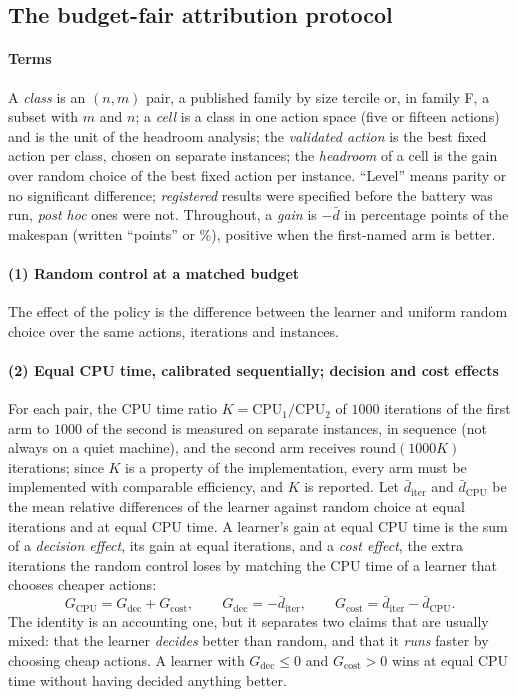 \subsection{The budget-fair attribution protocol}
\label{sec:protocol}
\paragraph{Terms} A \emph{class} is an $(n,m)$ pair, a published family by size tercile or, in family F, a subset with $m$ and $n$; a \emph{cell} is a class in one action space (five or fifteen actions) and is the unit of the headroom analysis; the \emph{validated action} is the best fixed action per class, chosen on separate instances; the \emph{headroom} of a cell is the gain over random choice of the best fixed action per instance. ``Level'' means parity or no significant difference; \emph{registered} results were specified before the battery was run, \emph{post hoc} ones were not. Throughout, a \emph{gain} is $-\bar d$ in percentage points of the makespan (written ``points'' or $\%$), positive when the first-named arm is better.

\paragraph{(1) Random control at a matched budget} The effect of the policy is the difference between the learner and uniform random choice over the same actions, iterations and instances.

\paragraph{(2) Equal CPU time, calibrated sequentially; decision and cost effects} For each pair, the CPU time ratio $K=\mathrm{CPU}_1/\mathrm{CPU}_2$ of $1000$ iterations of the first arm to $1000$ of the second is measured on separate instances, in sequence (not always on a quiet machine), and the second arm receives $\mathrm{round}(1000K)$ iterations; since $K$ is a property of the implementation, every arm must be implemented with comparable efficiency, and $K$ is reported. Let $\bar d_{\mathrm{iter}}$ and $\bar d_{\mathrm{CPU}}$ be the mean relative differences of the learner against random choice at equal iterations and at equal CPU time. A learner's gain at equal CPU time is the sum of a \emph{decision effect}, its gain at equal iterations, and a \emph{cost effect}, the extra iterations the random control loses by matching the CPU time of a learner that chooses cheaper actions:
\begin{equation}
G_{\mathrm{CPU}}=G_{\mathrm{dec}}+G_{\mathrm{cost}},\qquad G_{\mathrm{dec}}=-\bar d_{\mathrm{iter}},\qquad G_{\mathrm{cost}}=\bar d_{\mathrm{iter}}-\bar d_{\mathrm{CPU}}.
\label{eq:decomp}
\end{equation}
The identity is an accounting one, but it separates two claims that are usually mixed: that the learner \emph{decides} better than random, and that it \emph{runs} faster by choosing cheap actions. A learner with $G_{\mathrm{dec}}\le0$ and $G_{\mathrm{cost}}>0$ wins at equal CPU time without having decided anything better.

